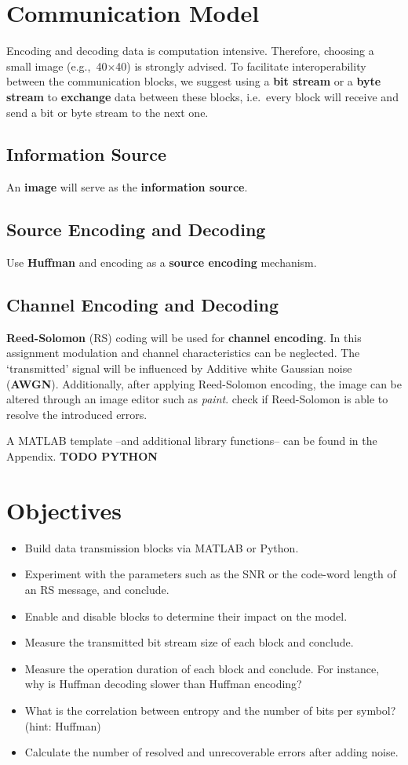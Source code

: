 \documentclass[12pt,a4paper]{article}
\begin{document}
\section{Communication Model}

Encoding and decoding data is computation intensive. Therefore, choosing a small image (e.g.,~40$\times$40) is strongly advised. To facilitate interoperability between the communication blocks, we suggest using a \textbf{bit stream} or a \textbf{byte stream} to \textbf{exchange} data between these blocks, i.e.\ every block will receive and send a bit or byte stream to the next one.

\subsection{Information Source}
An \textbf{image} will serve as the \textbf{information source}. 

\subsection{Source Encoding and Decoding}
Use \textbf{Huffman} and encoding as a \textbf{source encoding} mechanism.

\subsection{Channel Encoding and Decoding}
\textbf{Reed-Solomon} (RS) coding will be used for \textbf{channel encoding}. In this assignment modulation and channel characteristics can be neglected. The `transmitted' signal will be influenced by Additive white Gaussian noise (\textbf{AWGN}). Additionally, after applying Reed-Solomon encoding, the image can be altered through an image editor such as \textit{paint}. check if Reed-Solomon is able to resolve the introduced errors. 

A MATLAB template --and additional library functions-- can be found in the Appendix.
\textbf{TODO PYTHON}

\section{Objectives}
\begin{itemize}
	\item Build data transmission blocks via MATLAB or Python.%
	\item Experiment with the parameters such as the SNR or the code-word length of an RS message, and conclude.%
	\item Enable and disable blocks to determine their impact on the model.%
	\item Measure the transmitted bit stream size of each block and conclude.
	\item Measure the operation duration of each block and conclude.
	For instance, why is Huffman decoding slower than Huffman encoding?
	\item What is the correlation between entropy and the number of bits per symbol? (hint: Huffman)
	\item Calculate the number of resolved and unrecoverable errors after adding noise.
\end{itemize}
\end{document}
